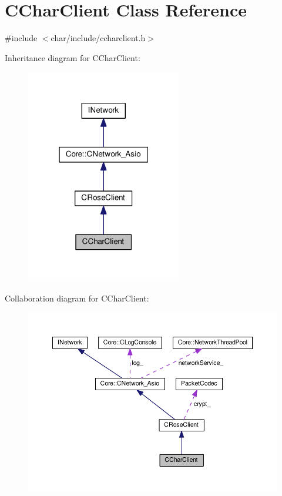 \hypertarget{classCCharClient}{}\section{C\+Char\+Client Class Reference}
\label{classCCharClient}


{\ttfamily \#include $<$char/include/ccharclient.\+h$>$}



Inheritance diagram for C\+Char\+Client\+:
\nopagebreak
\begin{figure}[H]
\begin{center}
\leavevmode
\includegraphics[width=193pt]{classCCharClient__inherit__graph}
\end{center}
\end{figure}


Collaboration diagram for C\+Char\+Client\+:
\nopagebreak
\begin{figure}[H]
\begin{center}
\leavevmode
\includegraphics[width=350pt]{classCCharClient__coll__graph}
\end{center}
\end{figure}
